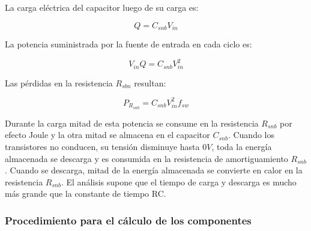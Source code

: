 La carga eléctrica del capacitor luego de su carga es:

$$ Q=C_{snb}V_{in} $$

La potencia suministrada por la fuente de entrada en cada ciclo es:

$$ V_{in}Q=C_{snb}V_{in}^{2} $$

Las pérdidas en la resistencia $R_{sbn}$ resultan:

$$ P_{R_{snb}}=C_{snb}V_{in}^{2}f_{sw} $$

Durante la carga mitad de esta potencia se consume en la resistencia $R_{snb}$ por efecto Joule y la otra mitad se almacena en el capacitor $C_{snb}$. 
Cuando los transistores no conducen, su tensión disminuye hasta $0V$, toda la energía almacenada se descarga y es consumida en la resistencia de amortiguamiento $R_{snb}$.
Cuando se descarga, mitad de la energía almacenada se convierte en calor en la resistencia $R_{snb}$. 
El análisis supone que el tiempo de carga y descarga es mucho más grande que la constante de tiempo RC. 

\subsubsection{Procedimiento para el cálculo de los componentes}

